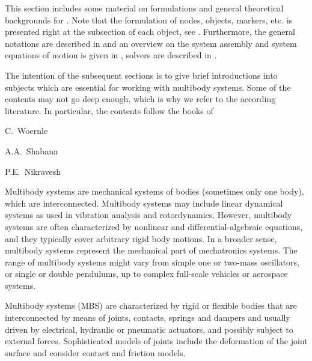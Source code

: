 

This section includes some material on formulations and general theoretical backgrounds for \codeName.
Note that the formulation of nodes, objects, markers, etc. is presented right at the subsection of each object, see .
Furthermore, the general notations are described in  and an overview on the system assembly and system equations of motion is given in , solvers are described in .

%
The intention of the subsequent sections is to give brief introductions into subjects which are essential for working with multibody systems.
Some of the contents may not go deep enough, which is why we refer to the according literature.
In particular, the contents follow the books of
\bi
  \item C.\ Woernle  \cite{woernle2024}
  \item A.A.\ Shabana  \cite{Shabana2013}
  \item P.E.\ Nikravesh  \cite{Nikravesh1988}
\ei

\noindent Multibody systems are mechanical systems of bodies (sometimes only one body), which are interconnected.
Multibody systems may include linear dynamical systems as used in vibration analysis and rotordynamics.
However, multibody systems are often characterized by nonlinear and differential-algebraic equations, and they typically cover arbitrary rigid body motions.
In a broader sense, multibody systems represent the mechanical part of mechatronics systems.
The range of multibody systems might vary from simple one or two-mass oscillators, or single or double pendulums, up to complex full-scale vehicles or aerospace systems. 

\noindent Multibody systems (MBS) are characterized by rigid or flexible bodies that are interconnected by means of joints, contacts, springs and dampers and usually driven by electrical, hydraulic or pneumatic actuators, and possibly subject to external forces. 
Sophisticated models of joints include the deformation of the joint surface and consider contact and friction models. 

